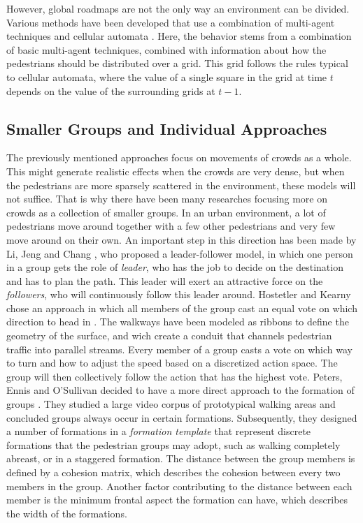 \documentclass[11pt]{book}
\begin{document}
However, global roadmaps are not the only way an environment can be divided. Various methods have been developed that use a combination of multi-agent techniques and cellular automata \cite{Dijkstra00amulti-agent}\cite{1241047}. Here, the behavior stems from a combination of basic multi-agent techniques, combined with information about how the pedestrians should be distributed over a grid. This grid follows the rules typical to cellular automata, where the value of a single square in the grid at time $t$ depends on the value of the surrounding grids at $t-1$.


\subsection{Smaller Groups and Individual Approaches}
The previously mentioned approaches focus on movements of crowds as a whole. This might generate realistic effects when the crowds are very dense, but when the pedestrians are more sparsely scattered in the environment, these models will not suffice. That is why there have been many researches focusing more on crowds as a collection of smaller groups. In an urban environment, a lot of pedestrians move around together with a few other pedestrians and very few move around on their own. An important step in this direction has been made by Li, Jeng and Chang \cite{leaderfollower}, who proposed a leader-follower model, in which one person in a group gets the role of \emph{leader}, who has the job to decide on the destination and has to plan the path. This leader will exert an attractive force on the \emph{followers}, who will continuously follow this leader around. Hostetler and Kearny chose an approach in which all members of the group cast an equal vote on which direction to head in \cite{Hostetler02strollingdown}. The walkways have been modeled as ribbons to define the geometry of the surface, and wich create a conduit that channels pedestrian traffic into parallel streams. Every member of a group casts a vote on which way to turn and how to adjust the speed based on a discretized action space. The group will then collectively follow the action that has the highest vote. Peters, Ennis and O'Sullivan decided to have a more direct approach to the formation of groups \cite{10.1109MCG.2009.69}. They studied a large video corpus of prototypical walking areas and concluded groups always occur in certain formations. Subsequently, they designed a number of formations in a \emph{formation template} that represent discrete formations that the pedestrian groups may adopt, such as walking completely abreast, or in a staggered formation. The distance between the group members is defined by a cohesion matrix, which describes the cohesion between every two members in the group. Another factor contributing to the distance between each member is the minimum frontal aspect the formation can have, which describes the width of the formations.\\
\end{document}
